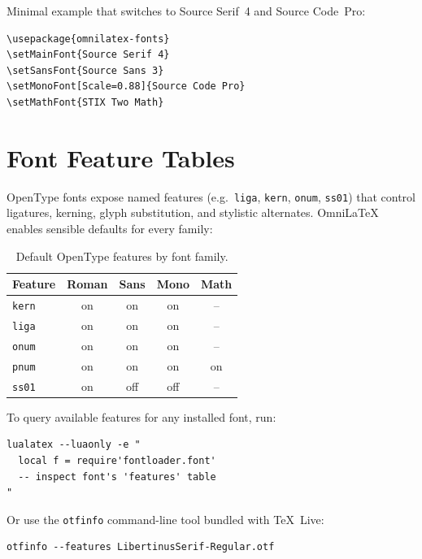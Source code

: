 Minimal example that switches to Source Serif~4 and Source Code~Pro:

\begin{verbatim}
\usepackage{omnilatex-fonts}
\setMainFont{Source Serif 4}
\setSansFont{Source Sans 3}
\setMonoFont[Scale=0.88]{Source Code Pro}
\setMathFont{STIX Two Math}
\end{verbatim}

\section{Font Feature Tables}

OpenType fonts expose named features (e.g.\ \texttt{liga}, \texttt{kern},
\texttt{onum}, \texttt{ss01}) that control ligatures, kerning, glyph
substitution, and stylistic alternates.  OmniLaTeX enables sensible
defaults for every family:

\begin{table}[htbp]
  \centering
  \caption{Default OpenType features by font family.}
  \label{tab:ot-features}
  \begin{tabular}{@{}lcccc@{}}
    \toprule
    Feature & Roman & Sans & Mono & Math \\
    \midrule
    \texttt{kern}   & on & on & on & -- \\
    \texttt{liga}   & on & on & on & -- \\
    \texttt{onum}   & on & on & on & -- \\
    \texttt{pnum}   & on & on & on & on  \\
    \texttt{ss01}   & on & off & off & -- \\
    \bottomrule
  \end{tabular}
\end{table}

To query available features for any installed font, run:

\begin{verbatim}
lualatex --luaonly -e "
  local f = require'fontloader.font'
  -- inspect font's 'features' table
"
\end{verbatim}

Or use the \texttt{otfinfo} command-line tool bundled with \TeX\ Live:

\begin{verbatim}
otfinfo --features LibertinusSerif-Regular.otf
\end{verbatim}

